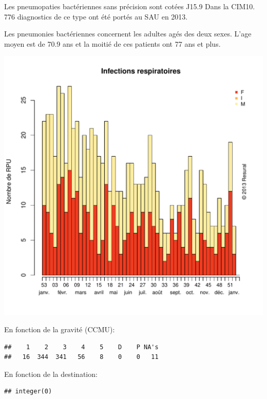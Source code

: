 \documentclass[12pt,english,french,twoside]{report}\usepackage[]{graphicx}\usepackage[]{color}
\makeatletter
\def\maxwidth{ %
  \ifdim\Gin@nat@width>\linewidth
    \linewidth
  \else
    \Gin@nat@width
  \fi
}
\newenvironment{kframe}{%
 \def\at@end@of@kframe{}%
 \ifinner\ifhmode%
  \def\at@end@of@kframe{\end{minipage}}%
  \begin{minipage}{\columnwidth}%
 \fi\fi%
 \def\FrameCommand##1{\hskip\@totalleftmargin \hskip-\fboxsep
 \colorbox{shadecolor}{##1}\hskip-\fboxsep
     \hskip-\linewidth \hskip-\@totalleftmargin \hskip\columnwidth}%
 \MakeFramed {\advance\hsize-\width
   \@totalleftmargin\z@ \linewidth\hsize
   \@setminipage}}%
 {\par\unskip\endMakeFramed%
 \at@end@of@kframe}
\newenvironment{knitrout}{}{} %
\makeatother
\begin{document}
Les pneumopaties bactériennes sans précision sont cotées J15.9 Dans la CIM10.
776 diagnostics de ce type ont été portés au SAU en 2013.

Les pneumonies bactériennes concernent les adultes agés des deux sexes. L'age moyen est de 70.9 ans et la moitié de ces patients ont 77 ans et plus.

\begin{knitrout}
\color{fgcolor}
\includegraphics[width=\maxwidth]{figure/pneumo} 

\end{knitrout}


En fonction de la gravité (CCMU):
\begin{knitrout}
\color{fgcolor}\begin{kframe}
\begin{verbatim}
##    1    2    3    4    5    D    P NA's 
##   16  344  341   56    8    0    0   11
\end{verbatim}
\end{kframe}
\end{knitrout}


En fonction de la destination:
\begin{knitrout}
\color{fgcolor}\begin{kframe}
\begin{verbatim}
## integer(0)
\end{verbatim}
\end{kframe}
\end{knitrout}
\end{document}
